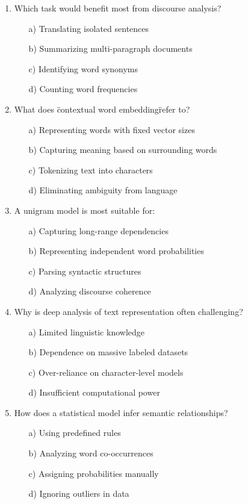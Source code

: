 \documentclass[8pt]{extarticle}
\begin{document}
\begin{multicols}{2}
\begin{enumerate}
\item Which task would benefit most from discourse analysis?
\begin{itemize}
    \item[a)] Translating isolated sentences
    \item[b)] Summarizing multi-paragraph documents
    \item[c)] Identifying word synonyms
    \item[d)] Counting word frequencies
\end{itemize}

\item What does \"contextual word embedding\" refer to?
\begin{itemize}
    \item[a)] Representing words with fixed vector sizes
    \item[b)] Capturing meaning based on surrounding words
    \item[c)] Tokenizing text into characters
    \item[d)] Eliminating ambiguity from language
\end{itemize}

\item A unigram model is most suitable for:
\begin{itemize}
    \item[a)] Capturing long-range dependencies
    \item[b)] Representing independent word probabilities
    \item[c)] Parsing syntactic structures
    \item[d)] Analyzing discourse coherence
\end{itemize}

\item Why is deep analysis of text representation often challenging?
\begin{itemize}
    \item[a)] Limited linguistic knowledge
    \item[b)] Dependence on massive labeled datasets
    \item[c)] Over-reliance on character-level models
    \item[d)] Insufficient computational power
\end{itemize}

\item How does a statistical model infer semantic relationships?
\begin{itemize}
    \item[a)] Using predefined rules
    \item[b)] Analyzing word co-occurrences
    \item[c)] Assigning probabilities manually
    \item[d)] Ignoring outliers in data
\end{itemize}


\end{enumerate}
\end{multicols}
\end{document}
